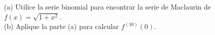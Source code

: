 \item (a) Utilice la serie binomial para encontrar la serie de Maclaurin de $f(x) = \sqrt{1+x^2}$. \\
    (b) Aplique la parte (a) para calcular $f^{(10)}(0)$.
